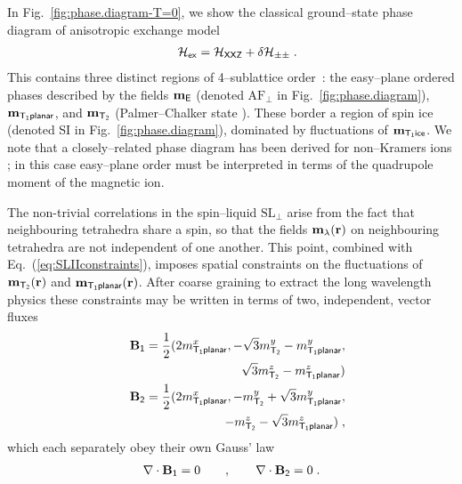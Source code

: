 \documentclass[apsrev4-1,prx,superscriptaddress,floatfix,twocolumn,longbibliography]{revtex4-1}
\begin{document}
 
In Fig.~\ref{fig:phase.diagram-T=0}, we show the classical ground--state 
phase diagram of anisotropic exchange model 
%
\begin{eqnarray}
&&\mathcal{H}_{\sf ex}=\mathcal{H}_{\sf XXZ}+\delta\mathcal{H}_{\pm\pm} \; .
\label{eq:H.xxz+delta}
\end{eqnarray}
%
This contains three distinct regions of 4--sublattice order~: the 
easy--plane ordered phases described by the fields ${\bf m}_{\sf E}$ 
(denoted $\text{AF}_\perp$ 
in Fig.~\ref{fig:phase.diagram}), ${\bf m}_{\sf T_1 planar}$, 
and ${\bf m}_{\sf T_2}$ (Palmer--Chalker state \cite{palmer00}).
%
These border a region of spin ice 
(denoted SI in Fig.~\ref{fig:phase.diagram}), dominated by 
fluctuations of ${\bf m}_{\sf T_1 ice}$.   
%
We note that a closely--related phase diagram has been derived  
for non--Kramers ions \cite{Onoda2011a, petit16-PRB94};  
in this case easy--plane order must be interpreted in terms 
of the quadrupole moment of the magnetic ion.   


The non-trivial correlations in the spin--liquid $\text{SL}_\perp$ arise from the
fact that neighbouring tetrahedra share a spin, so that the fields
${\bf m}_{\lambda}(\mathbf{r})$ on neighbouring tetrahedra are
not independent of one another.
%
This point, combined with Eq.~(\ref{eq:SLIIconstraints}), imposes
spatial constraints on the fluctuations of  ${\bf m}_{\sf T_2}({\bf r})$
and ${\bf m}_{\sf T_1 planar}({\bf r})$.
%
After coarse graining to extract the long wavelength physics
these constraints may be written in terms of two, independent, vector
fluxes
\begin{eqnarray}
 &&  {\bf B}_{\sf 1} =  \frac{1}{2}( 2 m_{\sf T_1 planar}^x,  -\sqrt{3}m_{\sf T_2}^y-m_{\sf T_1 planar}^y, 
\nonumber \\
&& \qquad \qquad
\sqrt{3} m_{\sf T_2}^z- m_{\sf T_1 planar}^z) \nonumber\\
 &&  {\bf B}_{\sf 2} =  \frac{1}{2}(2 m_{\sf T_1 planar}^x,  -m_{\sf T_2}^y+\sqrt{3}m_{\sf T_1 planar}^y,
\nonumber \\
&& \qquad \qquad
-m_{\sf T_2}^z - \sqrt{3}m_{\sf T_1 planar}^z) \; ,
\label{eq:fluxes}
\end{eqnarray}
which each separately obey their own Gauss' law
\begin{eqnarray}
   \nabla \cdot {\bf B}_{\sf 1}  =  0 
 \qquad , \qquad 
   \nabla \cdot {\bf B}_{\sf 2}  =  0  \; .
   \label{eq:div.m}
\end{eqnarray}
\end{document}
